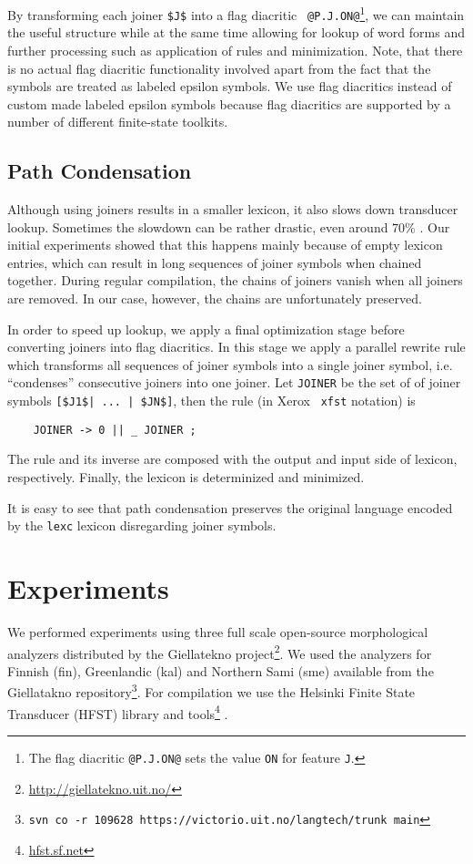 \documentclass[11pt]{article}
\begin{document}
By transforming each joiner {\tt \$J\$} into a flag diacritic {\tt
  @P.J.ON@}\footnote{The flag diacritic {\tt @P.J.ON@} sets the value
  {\tt ON} for feature {\tt J}.}, we can
maintain the useful structure while at the same time allowing for
lookup of word forms and further processing such as application of
rules and minimization. Note, that there is no actual flag diacritic
functionality involved apart from the fact that the symbols are
treated as labeled epsilon symbols. We use flag diacritics instead of
custom made labeled epsilon symbols because flag diacritics are
supported by a number of different finite-state toolkits.

\subsection{Path Condensation}\label{pc}

Although using joiners results in a smaller lexicon, it also slows down transducer lookup. Sometimes the slowdown can be rather drastic, even around 70\% \cite{drobac2014}.  Our initial experiments showed that this happens mainly because of empty lexicon entries, which can result in long sequences of joiner symbols when chained together. During regular compilation, the chains of joiners vanish when all joiners are removed. In our case, however, the chains are unfortunately preserved.

In order to speed up lookup, we apply a final optimization stage
before converting joiners into flag diacritics. In this stage we apply
a parallel rewrite rule which transforms all sequences of joiner
symbols into a single joiner symbol, i.e. ``condenses'' consecutive
joiners into one joiner. Let {\tt JOINER} be the set of of joiner
symbols {\tt [\$J1\$| ... | \$JN\$]}, then the rule (in Xerox {\tt
  xfst} notation) is
\begin{verbatim} 
    JOINER -> 0 || _ JOINER ;
\end{verbatim}
The rule and its inverse are composed with the output and input side of lexicon, respectively. Finally, the lexicon is determinized and minimized.

It is easy to see that path condensation preserves the original language encoded by the {\tt lexc} lexicon disregarding joiner symbols.

\section{Experiments}\label{sec:experiments}
We performed experiments using three full scale open-source
morphological analyzers distributed by the Giellatekno
project\footnote{\url{http://giellatekno.uit.no/}}. We used the analyzers
for Finnish (fin), Greenlandic (kal) and Northern
Sami (sme) available from the Giellatakno repository\footnote{{\tt svn
    co -r 109628 https://victorio.uit.no/langtech/trunk main}}. For
compilation we use the Helsinki Finite State Transducer (HFST) library
and tools\footnote{\url{hfst.sf.net}} \cite{linden2011}.
\end{document}
